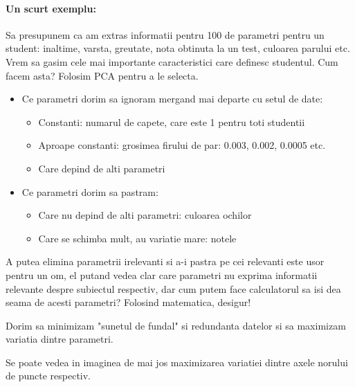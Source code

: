 \documentclass[12pt,oneside]{article}
\begin{document}
\paragraph{Un scurt exemplu: \cite{data_reduction}}
Sa presupunem ca am extras informatii pentru 100 de parametri pentru un student: inaltime, varsta, greutate, nota obtinuta la un test, culoarea parului etc. Vrem sa gasim cele mai importante caracteristici care definesc studentul. Cum facem asta? Folosim PCA pentru a le selecta.

\begin{itemize}
	\item Ce parametri dorim sa ignoram mergand mai departe cu setul de date:
	\begin{itemize}
	\item Constanti: numarul de capete, care este 1 pentru toti studentii
	\item Aproape constanti: grosimea firului de par: 0.003, 0.002, 0.0005 etc.
	\item Care depind de alti parametri
	\end{itemize}
	\item Ce parametri dorim sa pastram:
	\begin{itemize}
	\item Care nu depind de alti parametri: culoarea ochilor
	\item Care se schimba mult, au variatie mare: notele
	\end{itemize}
\end{itemize}

A putea elimina parametrii irelevanti si a-i pastra pe cei relevanti este usor pentru un om, el putand vedea clar care parametri nu exprima informatii relevante despre subiectul respectiv, dar cum putem face calculatorul sa isi dea seama de acesti parametri? Folosind matematica, desigur!

Dorim sa minimizam "sunetul de fundal" si redundanta datelor si sa maximizam variatia dintre parametri.

Se poate vedea in imaginea de mai jos maximizarea variatiei dintre axele norului de puncte respectiv.\cite{pca_shlens}
\end{document}
